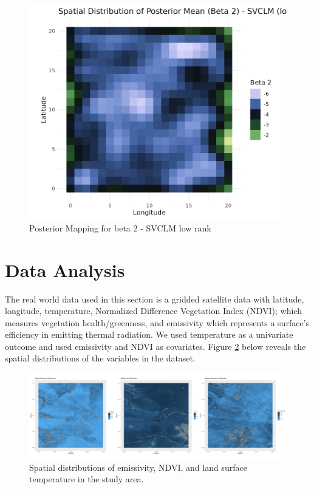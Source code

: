  \begin{figure}[ht]
 \centering
 \includegraphics[width=\textwidth]{../../figures/plot_C_SVCLM_LOW.png}
 \caption{Posterior Mapping for beta 2 - SVCLM low rank}
 \label{fig:SVCLMAC}
 \end{figure}

\section{Data Analysis}
\label{sec:data analysis}
The real world data used in this section is a gridded satellite data with latitude, longitude, temperature, Normalized Difference Vegetation Index (NDVI); which measures vegetation health/greenness, and emissivity which represents a surface's efficiency in emitting thermal radiation. We used temperature as a univariate outcome and used emissivity and NDVI as covariates.
Figure \ref{fig:spatialpatterns} below reveals the spatial  distributions of the variables in the dataset.

 \begin{figure}[ht]
 \centering
 \includegraphics[width=\textwidth]{../../figures/spatial_horizontal_stack.png}
 \caption{
   Spatial distributions of emissivity, NDVI, and  land surface temperature in the study area. 
 }
 \label{fig:spatialpatterns}
 \end{figure}
 
